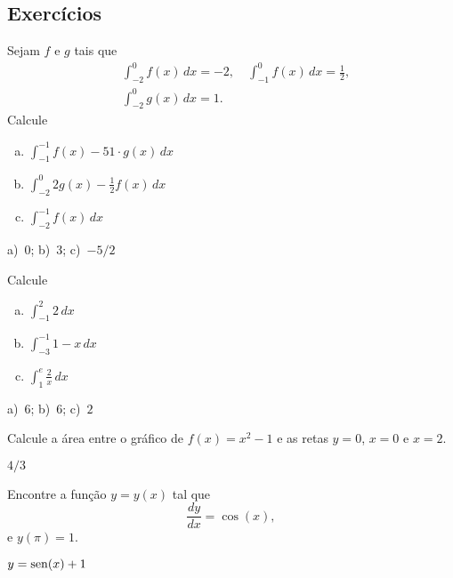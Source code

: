 \subsection{Exercícios}


\begin{exer}
  Sejam $f$ e $g$ tais que
  \begin{align}
    &\int_{-2}^{0} f(x)\,dx = -2,\quad\int_{-1}^{0} f(x)\,dx = \frac{1}{2},\\
    &\int_{-2}^0 g(x)\,dx = 1.
  \end{align}
  Calcule
  \begin{enumerate}[a)]
  \item $\displaystyle \int_{-1}^{-1} f(x) - 51\cdot g(x)\,dx$
  \item $\displaystyle \int_{-2}^{0} 2g(x) - \frac{1}{2}f(x)\,dx$
  \item $\displaystyle \int_{-2}^{-1} f(x)\,dx$
  \end{enumerate}
\end{exer}
\begin{resp}
  a)~$0$; b)~$3$; c)~$-5/2$
\end{resp}

\begin{exer}
  Calcule
  \begin{enumerate}[a)]
  \item $\displaystyle\int_{-1}^2 2\,dx$
  \item $\displaystyle\int_{-3}^{-1} 1-x\,dx$
  \item $\displaystyle\int_{1}^{e} \frac{2}{x}\,dx$
  \end{enumerate}
\end{exer}
\begin{resp}
  a)~$6$; b)~$6$; c)~$2$
\end{resp}

\begin{exer}
  Calcule a área entre o gráfico de $f(x) = x^2-1$ e as retas $y=0$, $x=0$ e $x=2$.
\end{exer}
\begin{resp}
  $4/3$
\end{resp}

\begin{exer}
  Encontre a função $y = y(x)$ tal que
  \begin{equation}
    \frac{dy}{dx} = \cos(x),
  \end{equation}
  e $y(\pi) = 1$.
\end{exer}
\begin{resp}
  $y = \operatorname{sen}(x) + 1$
\end{resp}

